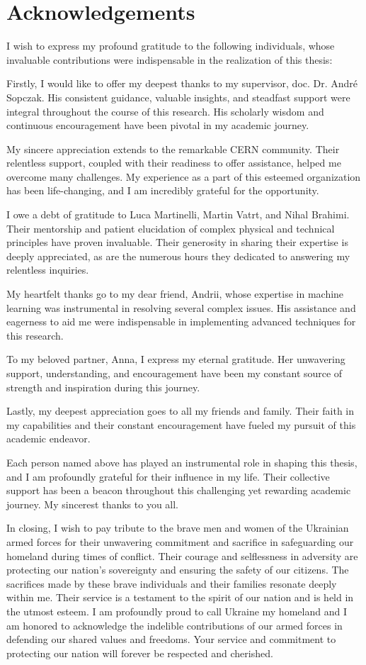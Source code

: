 \chapter*{Acknowledgements}

I wish to express my profound gratitude to the following individuals, whose invaluable contributions were indispensable
in the realization of this thesis:

Firstly, I would like to offer my deepest thanks to my supervisor, doc. Dr. Andr\'{e}\: Sopczak. His consistent
guidance, valuable insights, and steadfast support were integral throughout the course of this research. His scholarly
wisdom and continuous encouragement have been pivotal in my academic journey.

My sincere appreciation extends to the remarkable CERN community. Their relentless support, coupled with their
readiness to offer assistance, helped me overcome many challenges. My experience as a part of this esteemed
organization has been life-changing, and I am incredibly grateful for the opportunity.

I owe a debt of gratitude to Luca Martinelli, Martin Vatrt, and Nihal Brahimi. Their mentorship and patient elucidation
of complex physical and technical principles have proven invaluable. Their generosity in sharing their expertise is
deeply appreciated, as are the numerous hours they dedicated to answering my relentless inquiries.

My heartfelt thanks go to my dear friend, Andrii, whose expertise in machine learning was instrumental in resolving
several complex issues. His assistance and eagerness to aid me were indispensable in implementing advanced techniques
for this research.

To my beloved partner, Anna, I express my eternal gratitude. Her unwavering support, understanding, and encouragement
have been my constant source of strength and inspiration during this journey.

Lastly, my deepest appreciation goes to all my friends and family. Their faith in my capabilities and their constant
encouragement have fueled my pursuit of this academic endeavor.

Each person named above has played an instrumental role in shaping this thesis, and I am profoundly grateful for their
influence in my life. Their collective support has been a beacon throughout this challenging yet rewarding academic
journey. My sincerest thanks to you all.

In closing, I wish to pay tribute to the brave men and women of the Ukrainian armed forces for their unwavering
commitment and sacrifice in safeguarding our homeland during times of conflict. Their courage and selflessness in
adversity are protecting our nation's sovereignty and ensuring the safety of our citizens. The sacrifices made by these
brave individuals and their families resonate deeply within me. Their service is a testament to the spirit of our nation
and is held in the utmost esteem. I am profoundly proud to call Ukraine my homeland and I am honored to acknowledge the
indelible contributions of our armed forces in defending our shared values and freedoms.  Your service and commitment to
protecting our nation will forever be respected and cherished.